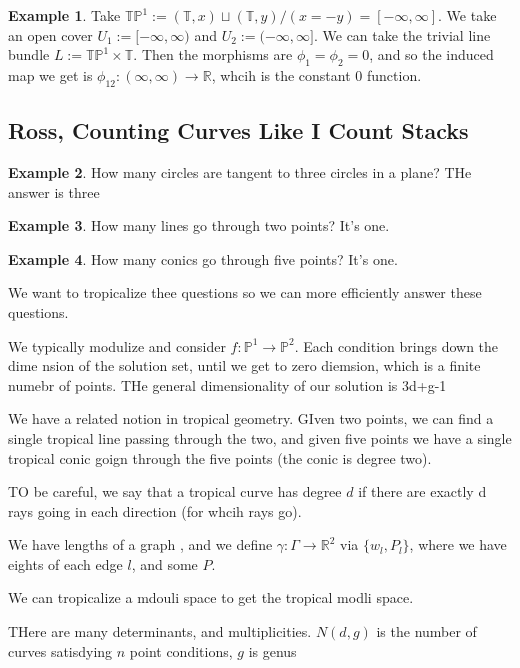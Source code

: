 \documentclass[12pt]{memoir}
\theoremstyle{definition}
\newtheorem{protoexample}{Example}[section]
\newenvironment{ex}
   {\begin{protoexample}}
   {\end{protoexample}}
\def\RR{{\mathbb R}}
\def\TT{{\mathbb T}}
\def\PP{{\mathbb P}}
\begin{document}
  \begin{ex}
    Take $\TT\PP^1 := (\TT,x) \sqcup (\TT,y)/(x=-y)=[-\infty,\infty]$. We take an open cover $U_1:= [-\infty, \infty)$ and $U_2:=(-\infty, \infty]$. We can take the trivial line bundle $L:=\TT\PP^1 \times \TT$. Then the morphisms are $\phi_1=\phi_2=0$, and so the induced map we get is $\phi_{12}:(\infty,\infty) \rightarrow \RR$, whcih is the constant $0$ function.
  \end{ex}



  \subsection{Ross, Counting Curves Like I Count Stacks}

\begin{ex}
    How many circles are tangent to three circles in a plane? THe answer is three
\end{ex}

\begin{ex}
    How many lines go through two points? It's one.
\end{ex}

\begin{ex}
    How many conics go through five points? It's one.
\end{ex}

We want to tropicalize thee questions so we can more efficiently answer these questions.

We typically modulize and consider $f:\PP^1 \rightarrow \PP^2$. Each condition brings down the dime nsion of the solution set, until we get to zero diemsion, which is a finite numebr of points. THe general dimensionality of our solution is 3d+g-1

We have a related notion in tropical geometry. GIven two points, we can find a single tropical line passing through the two, and given five points we have a single tropical conic goign through the five points (the conic is degree two). 


TO be careful, we say that a tropical curve has degree $d$ if there are exactly d rays going in each direction (for whcih rays go).


We have lengths of a graph , and we define $\gamma:\Gamma \rightarrow \RR^2$ via $\{w_l,P_l\}$, where we have eights of each edge $l$, and some $P$.


We can tropicalize a mdouli space to get the tropical modli space.

THere are many determinants, and multiplicities. $N(d,g)$ is the number of curves satisdying $n$ point conditions, $g$ is genus
\end{document}
